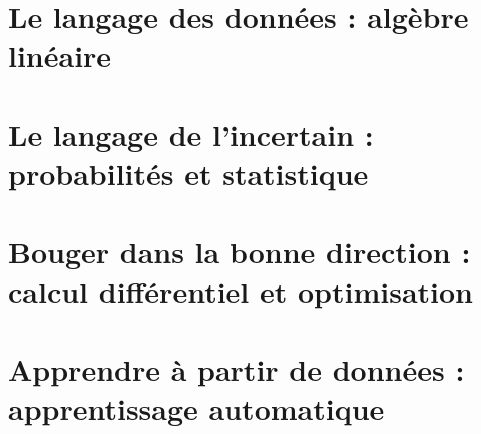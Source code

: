 \documentclass{ml4ebook}     %
\begin{document}
\frontmatter



\cleardoublepage
{}
\tableofcontents

\mainmatter

%

\part{Le langage des données : algèbre linéaire}


\part{Le langage de l'incertain : probabilités et statistique}

\part{Bouger dans la bonne direction : calcul différentiel et optimisation}
% 
% 
% 
% 

\part{Apprendre à partir de données : apprentissage automatique}
% 
\end{document}
